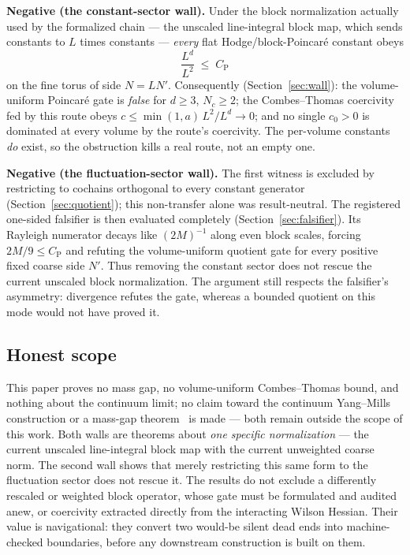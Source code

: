 \documentclass[11pt]{article}
\theoremstyle{definition}
\newcommand{\CP}{C_{\mathrm{P}}}
\begin{document}
\textbf{Negative (the constant-sector wall).}  Under the block
normalization actually used by the formalized chain --- the unscaled
line-integral block map, which sends constants to $L$ times constants ---
\emph{every} flat Hodge/block-Poincar\'e constant obeys
\[
\frac{L^d}{L^2} \;\le\; \CP
\]
on the fine torus of side $N = LN'$.  Consequently (Section~\ref{sec:wall}):
the volume-uniform Poincar\'e gate is \emph{false} for $d \ge 3$,
$N_c\ge 2$; the Combes--Thomas coercivity fed by this route obeys
$c \le \min(1,a)\,L^2/L^d \to 0$; and no single $c_0>0$ is dominated at
every volume by the route's coercivity.  The per-volume constants
\emph{do} exist, so the obstruction kills a real route, not an empty one.

\textbf{Negative (the fluctuation-sector wall).}  The first witness is
excluded by restricting to cochains orthogonal to every constant
generator (Section~\ref{sec:quotient}); this non-transfer alone was
result-neutral.  The registered one-sided falsifier is then evaluated
completely (Section~\ref{sec:falsifier}).  Its Rayleigh numerator decays
like $(2M)^{-1}$ along even block scales, forcing
$2M/9\le \CP$ and refuting the volume-uniform quotient gate for every
positive fixed coarse side $N'$.  Thus removing the constant sector does
not rescue the current unscaled block normalization.  The argument still
respects the falsifier's asymmetry: divergence refutes the gate, whereas a
bounded quotient on this mode would not have proved it.

\subsection*{Honest scope}

This paper proves no mass gap, no volume-uniform Combes--Thomas bound,
and nothing about the continuum limit; no claim toward the continuum
Yang--Mills construction or a mass-gap theorem~\cite{JaffeWitten} is
made --- both remain outside the scope of this work.
Both walls are theorems about \emph{one specific normalization} --- the
current unscaled line-integral block map with the current unweighted
coarse norm.  The second wall shows that merely restricting this same
form to the fluctuation sector does not rescue it.  The results do not
exclude a differently rescaled or weighted block operator, whose gate
must be formulated and audited anew, or coercivity extracted directly
from the interacting Wilson Hessian.  Their value is navigational: they
convert two would-be silent dead ends into machine-checked boundaries,
before any downstream construction is built on them.
\end{document}
